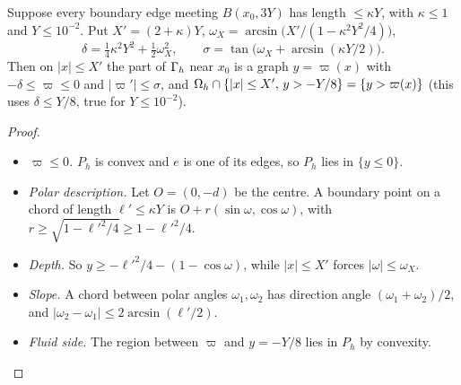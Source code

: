 \begin{lemma}\label{pb:lem:geom}
Suppose every boundary edge meeting $B(x_0,3Y)$ has length $\le\kappa Y$, with $\kappa\le1$ and $Y\le10^{-2}$. Put
$X'=(2+\kappa)Y$, $\omega_X=\arcsin\!\bigl(X'/(1-\kappa^2Y^2/4)\bigr)$,
\[\delta=\tfrac14\kappa^2Y^2+\tfrac12\omega_X^2,\qquad \sigma=\tan\bigl(\omega_X+\arcsin(\kappa Y/2)\bigr).\]
Then on $|x|\le X'$ the part of $\Gamma_h$ near $x_0$ is a graph $y=\varpi(x)$ with $-\delta\le\varpi\le0$ and $|\varpi'|\le\sigma$,
and $\Omega_h\cap\{|x|\le X',\,y>-Y/8\}=\{y>\varpi(x)\}$ (this uses $\delta\le Y/8$, true for $Y\le10^{-2}$).
\end{lemma}
\begin{proof}
\begin{itemize}
\item \emph{$\varpi\le0$.} $P_h$ is convex and $e$ is one of its edges, so $P_h$ lies in $\{y\le0\}$.
\item \emph{Polar description.} Let $O=(0,-d)$ be the centre. A boundary point on a chord of length $\ell'\le\kappa Y$ is
$O+r(\sin\omega,\cos\omega)$, with $r\ge\sqrt{1-\ell'^2/4}\ge1-\ell'^2/4$.
\item \emph{Depth.} So $y\ge-\ell'^2/4-(1-\cos\omega)$, while $|x|\le X'$ forces $|\omega|\le\omega_X$.
\item \emph{Slope.} A chord between polar angles $\omega_1,\omega_2$ has direction angle $(\omega_1+\omega_2)/2$, and
$|\omega_2-\omega_1|\le2\arcsin(\ell'/2)$.
\item \emph{Fluid side.} The region between $\varpi$ and $y=-Y/8$ lies in $P_h$ by convexity.\qedhere
\end{itemize}
\end{proof}

